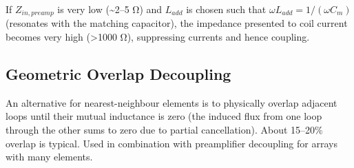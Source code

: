 				

If $Z_{in,preamp}$ is very low (\textasciitilde{}2–5 Ω) and $L_{add}$ is chosen such that $\omega L_{add} = 1/(\omega C_m)$ (resonates with the matching capacitor), the impedance presented to coil current becomes very high (\textgreater{}1000 Ω), suppressing currents and hence coupling.

				

\subsection{Geometric Overlap Decoupling}

				

An alternative for nearest-neighbour elements is to physically overlap adjacent loops until their mutual inductance is zero (the induced flux from one loop through the other sums to zero due to partial cancellation). About 15–20\% overlap is typical. Used in combination with preamplifier decoupling for arrays with many elements.




